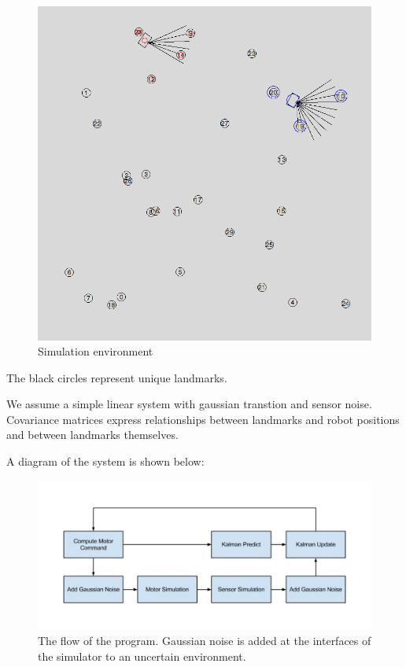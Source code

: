 \documentclass[prodmode,acmtecs]{acmsmall} %
\begin{document}
\begin{figure}[h!]
\includegraphics[width=\textwidth]{screenshot.png}
\caption{Simulation environment}
\end{figure}

The black circles represent unique landmarks.




We assume a simple linear system with gaussian transtion and sensor noise.  Covariance matrices express relationships between landmarks and robot positions and between landmarks themselves.  

A diagram of the system is shown below:

\begin{figure}[h!]
\includegraphics[width=\textwidth]{systemdiagram.png}
\caption{The flow of the program. Gaussian noise is added at the interfaces of the simulator to an uncertain environment.}
\end{figure}
\end{document}
